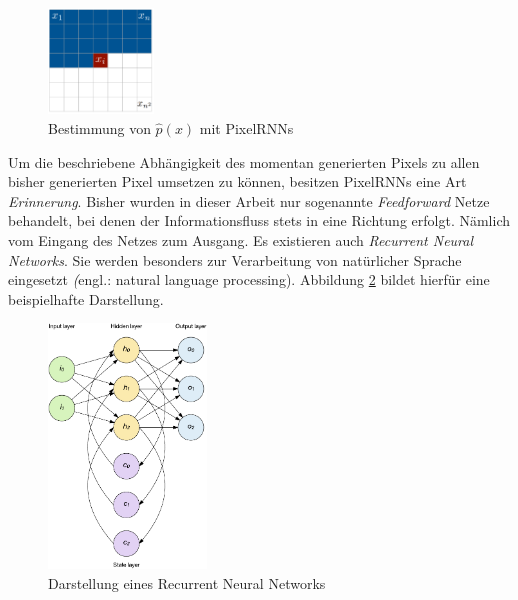 \begin{figure}[H]
   \centering
   \includegraphics[width=0.25\textwidth]{images/Generative Networks/PixelRNN.png}
   \caption{Bestimmung von $\hat{p}(x)$ mit PixelRNNs \cite{pixelRNN}}
   \label{fig:pixelRNN}
\end{figure}

Um die beschriebene Abhängigkeit des momentan generierten Pixels zu allen bisher generierten Pixel umsetzen zu können, besitzen \acp{PixelRNN} eine Art \emph{Erinnerung}. Bisher wurden in dieser Arbeit nur sogenannte \emph{Feedforward} Netze behandelt, bei denen der Informationsfluss stets in eine Richtung erfolgt. Nämlich vom Eingang des Netzes zum Ausgang. Es existieren auch \emph{Recurrent Neural Networks}. Sie werden besonders zur Verarbeitung von natürlicher Sprache eingesetzt \emph(engl.: natural language processing). Abbildung \ref{fig:RNN} bildet hierfür eine beispielhafte Darstellung.

\begin{figure}[H]
   \centering
   \includegraphics[width=0.375\textwidth]{images/Generative Networks/RNN.png}
   \caption{Darstellung eines Recurrent Neural Networks \cite{ibmRNN}}
   \label{fig:RNN}
\end{figure}


